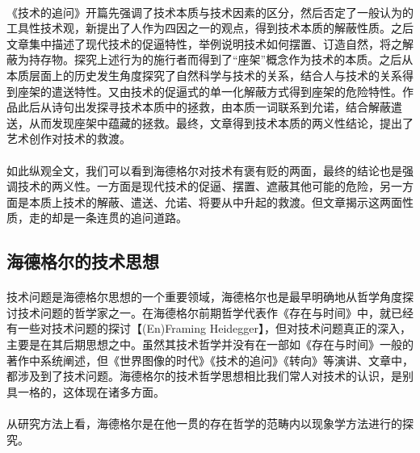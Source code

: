 \documentclass{article}
\begin{document}
		\paragraph{}
		《技术的追问》开篇先强调了技术本质与技术因素的区分，然后否定了一般认为的工具性技术观，新提出了人作为四因之一的观点，得到技术本质的解蔽性质。之后文章集中描述了现代技术的促逼特性，举例说明技术如何摆置、订造自然，将之解蔽为持存物。探究上述行为的施行者而得到了“座架”概念作为技术的本质。之后从本质层面上的历史发生角度探究了自然科学与技术的关系，结合人与技术的关系得到座架的遣送特性。又由技术的促逼式的单一化解蔽方式得到座架的危险特性。作品此后从诗句出发探寻技术本质中的拯救，由本质一词联系到允诺，结合解蔽遣送，从而发现座架中蕴藏的拯救。最终，文章得到技术本质的两义性结论，提出了艺术创作对技术的救渡。
		\paragraph{}
		如此纵观全文，我们可以看到海德格尔对技术有褒有贬的两面，最终的结论也是强调技术的两义性。一方面是现代技术的促逼、摆置、遮蔽其他可能的危险，另一方面是本质上技术的解蔽、遣送、允诺、将要从中升起的救渡。但文章揭示这两面性质，走的却是一条连贯的追问道路。

	\subsection{海德格尔的技术思想}
		\paragraph{}
		技术问题是海德格尔思想的一个重要领域，海德格尔也是最早明确地从哲学角度探讨技术问题的哲学家之一。在海德格尔前期哲学代表作《存在与时间》中，就已经有一些对技术问题的探讨【(En)Framing Heidegger】，但对技术问题真正的深入，主要是在其后期思想之中。虽然其技术哲学并没有在一部如《存在与时间》一般的著作中系统阐述，但《世界图像的时代》《技术的追问》《转向》等演讲、文章中，都涉及到了技术问题。海德格尔的技术哲学思想相比我们常人对技术的认识，是别具一格的，这体现在诸多方面。
		\paragraph{}
		从研究方法上看，海德格尔是在他一贯的存在哲学的范畴内以现象学方法进行的探究。
\end{document}
